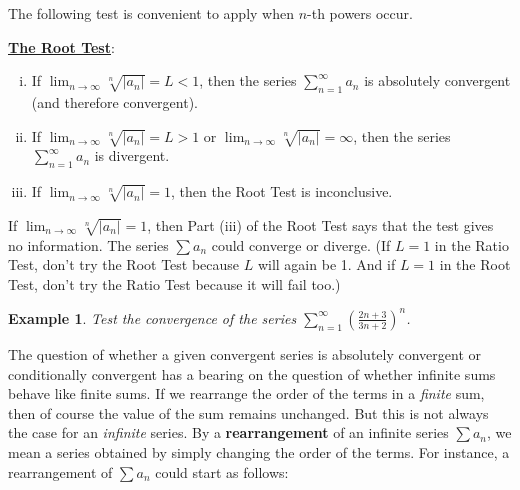 \documentclass[paper=a4, fontsize=11pt]{scrartcl} %
\numberwithin{equation}{section} %
\numberwithin{figure}{section} %
\numberwithin{table}{section} %
\newtheorem{example}{Example}
\newcommand{\ds}{\displaystyle}
\newcommand{\enter}{\vspace{5mm}}
\newcommand{\senter}{\vspace{3mm}}
\begin{document}
\newpage


\enter

\noindent The following test is convenient to apply when $n$-th powers occur.

\begin{framed}
\noindent\underline{\textbf{The Root Test}}:

\senter

\begin{enumerate}[(i)]

\item If $\ds\lim_{n\to\infty}\sqrt[n]{|a_n|}=L<1$, then the series $\ds\sum_{n=1}^{\infty}a_n$ is absolutely convergent (and therefore convergent).

\enter

\item If $\ds\lim_{n\to\infty}\sqrt[n]{|a_n|}=L>1$ or $\ds\lim_{n\to\infty}\sqrt[n]{|a_n|}=\infty$, then the series $\ds\sum_{n=1}^{\infty}a_n$ is divergent.

\enter

\item If $\ds\lim_{n\to\infty}\sqrt[n]{|a_n|}=1$, then the Root Test is inconclusive.

\end{enumerate}
\end{framed}

\enter

\noindent If $\ds\lim_{n\to\infty}\sqrt[n]{|a_n|}=1$, then Part (iii) of the Root Test says that the test gives no information. The series $\sum a_n$ could converge or diverge. (If $L=1$ in the Ratio Test, don't try the Root Test because $L$ will again be 1. And if $L=1$ in the Root Test, don't try the Ratio Test because it will fail too.)

\senter

\begin{example}
Test the convergence of the series $\ds\sum_{n=1}^{\infty}\left(\frac{2n+3}{3n+2}\right)^n$.
\end{example}

\newpage


\enter

\noindent The question of whether a given convergent series is absolutely convergent or conditionally convergent has a bearing on the question of whether infinite sums behave like finite sums. If we rearrange the order of the terms in a \emph{finite} sum, then of course the value of the sum remains unchanged. But this is not always the case for an \emph{infinite} series. By a \textbf{rearrangement} of an infinite series $\sum a_n$, we mean a series obtained by simply changing the order of the terms. For instance, a rearrangement of $\sum a_n$ could start as follows:
\end{document}
